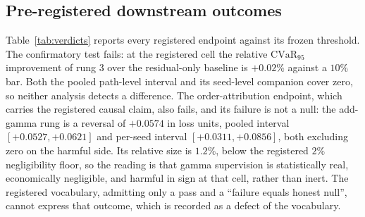 \documentclass{article}
\begin{document}
\subsection{Pre-registered downstream outcomes}
\label{sec:reg}

Table~\ref{tab:verdicts} reports every registered endpoint against its frozen
threshold. The confirmatory test fails: at the registered cell the relative
$\mathrm{CVaR}_{95}$ improvement of rung 3 over the residual-only baseline is $+0.02\%$
against a $10\%$ bar. Both the pooled path-level interval and its seed-level
companion cover zero, so neither analysis detects a difference. The order-attribution
endpoint, which carries the registered causal claim, also fails, and its failure is
not a null: the add-gamma rung is a reversal of $+0.0574$ in loss units, pooled
interval $[+0.0527, +0.0621]$ and per-seed interval $[+0.0311, +0.0856]$, both
excluding zero on the harmful side. Its relative size is $1.2\%$, below the
registered $2\%$ negligibility floor, so the reading is that gamma supervision is
statistically real, economically negligible, and harmful in sign at that cell,
rather than inert. The registered vocabulary, admitting only a pass and a
``failure equals honest null'', cannot express that outcome, which is recorded as a
defect of the vocabulary.
\end{document}
